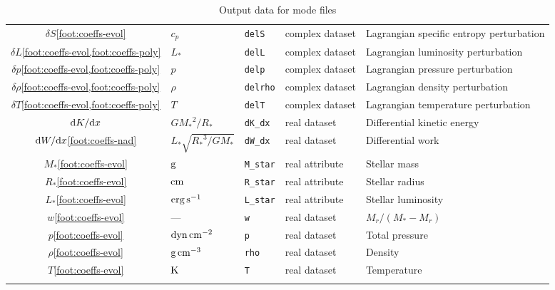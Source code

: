 \documentclass{article}
\newcommand{\diff}{\ensuremath{{\rm d}}}
\newcommand{\Rstar}{\ensuremath{R_{\ast}}}
\newcommand{\Mstar}{\ensuremath{M_{\ast}}}
\newcommand{\Lstar}{\ensuremath{L_{\ast}}}
\newcommand{\cm}{\ensuremath{{\rm cm}}}
\newcommand{\gram}{\ensuremath{{\rm g}}}
\newcommand{\second}{\ensuremath{{\rm s}}}
\newcommand{\dyne}{\ensuremath{{\rm dyn}}}
\newcommand{\erg}{\ensuremath{{\rm erg}}}
\newcommand{\kelvin}{\ensuremath{{\rm K}}}
\begin{document}
\begin{center}
\begin{longtable}{cllll}
$\delta S$\cref{foot:coeffs-evol} & $c_{p}$ & \texttt{delS} & complex dataset & Lagrangian specific entropy perturbation \\
$\delta L$\cref{foot:coeffs-evol,foot:coeffs-poly} & \Lstar & \texttt{delL} & complex dataset & Lagrangian luminosity perturbation \\
$\delta p$\cref{foot:coeffs-evol,foot:coeffs-poly} & $p$ & \texttt{delp} & complex dataset & Lagrangian pressure perturbation \\
$\delta \rho$\cref{foot:coeffs-evol,foot:coeffs-poly} & $\rho$ & \texttt{delrho} & complex dataset & Lagrangian density perturbation \\
$\delta T$\cref{foot:coeffs-evol,foot:coeffs-poly} & $T$ & \texttt{delT} & complex dataset & Lagrangian temperature perturbation \\
$\diff K/\diff x$ & $G\Mstar^{2}/\Rstar$ & \texttt{dK\_dx} & real dataset & Differential kinetic energy \\
$\diff W/\diff x$\cref{foot:coeffs-nad} & $\Lstar \sqrt{\Rstar^{3}/G\Mstar}$ & \texttt{dW\_dx} & real dataset & Differential work \\ 
\Mstar\cref{foot:coeffs-evol} & \gram & \texttt{M\_star} & real attribute & Stellar mass \\
\Rstar\cref{foot:coeffs-evol} & \cm & \texttt{R\_star} & real attribute & Stellar radius \\
\Lstar\cref{foot:coeffs-evol} & $\erg\,\second^{-1}$ & \texttt{L\_star} & real attribute & Stellar luminosity \\
$w$\cref{foot:coeffs-evol} & --- & \texttt{w} & real dataset & $M_{r}/(\Mstar-M_{r})$ \\
$p$\cref{foot:coeffs-evol} & $\dyne\,\cm^{-2}$ & \texttt{p} & real dataset & Total pressure \\
$\rho$\cref{foot:coeffs-evol} & $\gram\,\cm^{-3}$ & \texttt{rho} & real dataset & Density \\
$T$\cref{foot:coeffs-evol} & $\kelvin$ & \texttt{T} & real dataset & Temperature \\ \hline
\caption{Output data for mode files}
\end{longtable}
\end{center}



\end{document}
